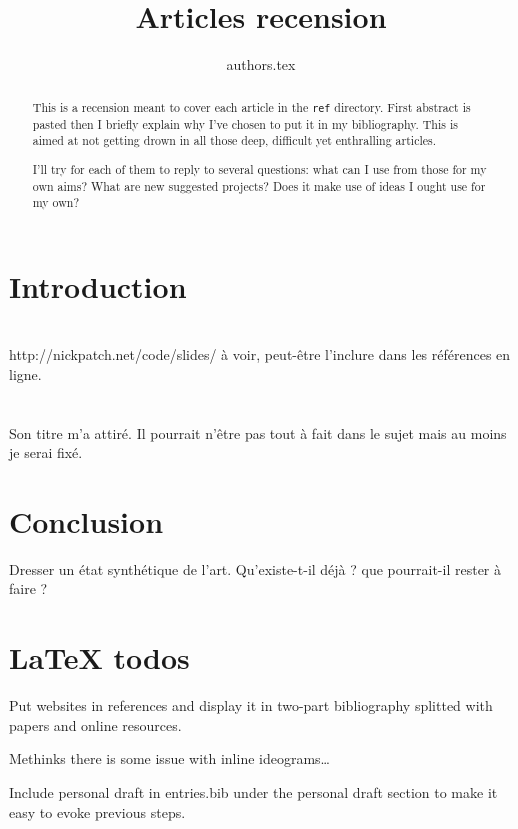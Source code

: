 \documentclass[12pt,onecolumn]{article}
\title{Articles recension}
\author{{authors.tex}}
\begin{document}
\maketitle
{}
\begin{abstract}
\par This is a recension meant to cover each article in the \texttt{ref} directory. First abstract is pasted then I briefly explain why I've chosen to put it in my bibliography. This is aimed at not getting drown in all those deep, difficult yet enthralling articles.\par I'll try for each of them to reply to several questions: what can I use from those for my own aims? What are new suggested projects? Does it make use of ideas I ought use for my own?
\end{abstract}

\tableofcontents



\section*{Introduction}

\section{}


\section{}

http://nickpatch.net/code/slides/ à voir, peut-être l'inclure dans les références en ligne.
\section{}
Son titre m'a attiré. Il pourrait n'être pas tout à fait dans le sujet mais au moins je serai fixé.

\section*{Conclusion}
Dresser un état synthétique de l'art. Qu'existe-t-il déjà ? que pourrait-il rester à faire ?

\section{\LaTeX{} todos}
Put websites in references and display it in two-part bibliography splitted with papers and online resources.

Methinks there is some issue with inline ideograms\dots{}

Include personal draft in entries.bib under the personal draft section to make it easy to evoke previous steps.
\end{document}
